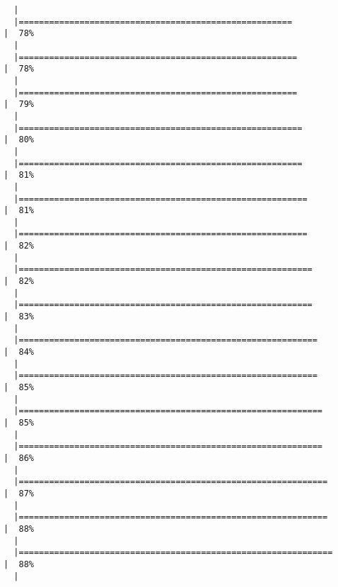 \documentclass[
  letterpaper,
]{book}
\begin{document}
\begin{verbatim}
  |                                                                            
  |======================================================                |  78%
  |                                                                            
  |=======================================================               |  78%
  |                                                                            
  |=======================================================               |  79%
  |                                                                            
  |========================================================              |  80%
  |                                                                            
  |========================================================              |  81%
  |                                                                            
  |=========================================================             |  81%
  |                                                                            
  |=========================================================             |  82%
  |                                                                            
  |==========================================================            |  82%
  |                                                                            
  |==========================================================            |  83%
  |                                                                            
  |===========================================================           |  84%
  |                                                                            
  |===========================================================           |  85%
  |                                                                            
  |============================================================          |  85%
  |                                                                            
  |============================================================          |  86%
  |                                                                            
  |=============================================================         |  87%
  |                                                                            
  |=============================================================         |  88%
  |                                                                            
  |==============================================================        |  88%
  |                                                                            

\end{verbatim}
\end{document}
